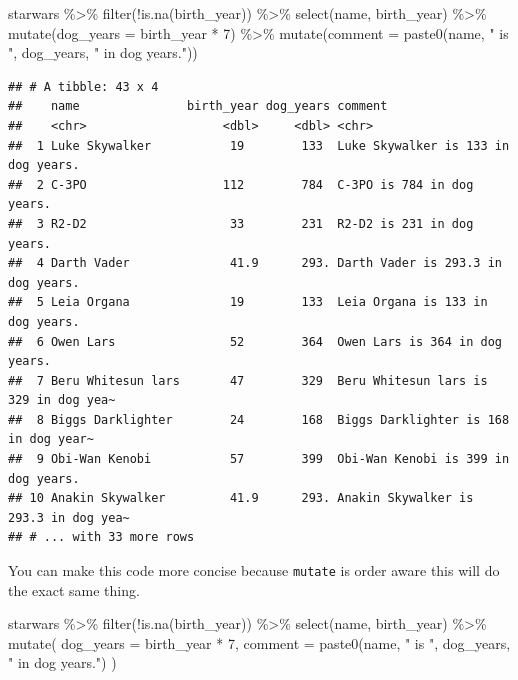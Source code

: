 \documentclass[]{tufte-handout}
\newenvironment{Shaded}{}{}
\newcommand{\AttributeTok}[1]{\textcolor[rgb]{0.49,0.56,0.16}{#1}}
\newcommand{\DecValTok}[1]{\textcolor[rgb]{0.25,0.63,0.44}{#1}}
\newcommand{\FunctionTok}[1]{\textcolor[rgb]{0.02,0.16,0.49}{#1}}
\newcommand{\NormalTok}[1]{#1}
\newcommand{\SpecialCharTok}[1]{\textcolor[rgb]{0.25,0.44,0.63}{#1}}
\newcommand{\StringTok}[1]{\textcolor[rgb]{0.25,0.44,0.63}{#1}}
\begin{document}
\begin{Shaded}
\begin{Highlighting}[]
\NormalTok{starwars }\SpecialCharTok{\%\textgreater{}\%}
  \FunctionTok{filter}\NormalTok{(}\SpecialCharTok{!}\FunctionTok{is.na}\NormalTok{(birth\_year)) }\SpecialCharTok{\%\textgreater{}\%}
  \FunctionTok{select}\NormalTok{(name, birth\_year) }\SpecialCharTok{\%\textgreater{}\%}
  \FunctionTok{mutate}\NormalTok{(}\AttributeTok{dog\_years =}\NormalTok{ birth\_year }\SpecialCharTok{*} \DecValTok{7}\NormalTok{) }\SpecialCharTok{\%\textgreater{}\%}
  \FunctionTok{mutate}\NormalTok{(}\AttributeTok{comment =} \FunctionTok{paste0}\NormalTok{(name, }\StringTok{" is "}\NormalTok{, dog\_years, }\StringTok{" in dog years."}\NormalTok{))}
\end{Highlighting}
\end{Shaded}

\begin{verbatim}
## # A tibble: 43 x 4
##    name               birth_year dog_years comment                              
##    <chr>                   <dbl>     <dbl> <chr>                                
##  1 Luke Skywalker           19        133  Luke Skywalker is 133 in dog years.  
##  2 C-3PO                   112        784  C-3PO is 784 in dog years.           
##  3 R2-D2                    33        231  R2-D2 is 231 in dog years.           
##  4 Darth Vader              41.9      293. Darth Vader is 293.3 in dog years.   
##  5 Leia Organa              19        133  Leia Organa is 133 in dog years.     
##  6 Owen Lars                52        364  Owen Lars is 364 in dog years.       
##  7 Beru Whitesun lars       47        329  Beru Whitesun lars is 329 in dog yea~
##  8 Biggs Darklighter        24        168  Biggs Darklighter is 168 in dog year~
##  9 Obi-Wan Kenobi           57        399  Obi-Wan Kenobi is 399 in dog years.  
## 10 Anakin Skywalker         41.9      293. Anakin Skywalker is 293.3 in dog yea~
## # ... with 33 more rows
\end{verbatim}

You can make this code more concise because \texttt{mutate} is order
aware this will do the exact same thing.

\begin{Shaded}
\begin{Highlighting}[]
\NormalTok{starwars }\SpecialCharTok{\%\textgreater{}\%}
  \FunctionTok{filter}\NormalTok{(}\SpecialCharTok{!}\FunctionTok{is.na}\NormalTok{(birth\_year)) }\SpecialCharTok{\%\textgreater{}\%}
  \FunctionTok{select}\NormalTok{(name, birth\_year) }\SpecialCharTok{\%\textgreater{}\%}
  \FunctionTok{mutate}\NormalTok{(}
    \AttributeTok{dog\_years =}\NormalTok{ birth\_year }\SpecialCharTok{*} \DecValTok{7}\NormalTok{,}
    \AttributeTok{comment =} \FunctionTok{paste0}\NormalTok{(name, }\StringTok{" is "}\NormalTok{, dog\_years, }\StringTok{" in dog years."}\NormalTok{)}
\NormalTok{  )}
\end{Highlighting}
\end{Shaded}
\end{document}
